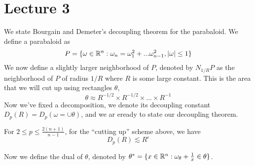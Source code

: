 \section*{Lecture 3}
We state Bourgain and Demeter's decoupling theorem for the parabaloid. We define a parabaloid as
\begin{equation*}
    P=\{\omega\in\mathbb{R}^n: \omega_n=\omega_1^2+...\omega_{n-1}^2, |\omega|\leq 1\}
\end{equation*}
We now define a slightly larger neighborhood of $P$, denoted by $N_{1/R}P$ as the neighborhood of $P$ of radius $1/R$ where $R$ is some large constant. This is the area that we will cut up using rectangles $\theta$,
\begin{equation*}
    \theta\approx R^{-1/2}\times R^{-1/2}\times...\times R^{-1}
\end{equation*}
Now we've fixed a decomposition, we denote its decoupling constant $D_p(R)=D_p(\omega=\cup\theta)$, and we ar eready to state our decoupling theorem.

\begin{theorem}
    For $2\leq p\leq\frac{2(n+1)}{n-1}$, for the ``cutting up'' scheme above, we have
    \begin{equation*}
        D_p(R)\lesssim R^{\epsilon}
    \end{equation*}
\end{theorem}

Now we define the dual of $\theta$, denoted by $\theta^*=\{x\in\mathbb{R}^n: \omega_\theta+\frac{1}{x}\in\theta\}$.

